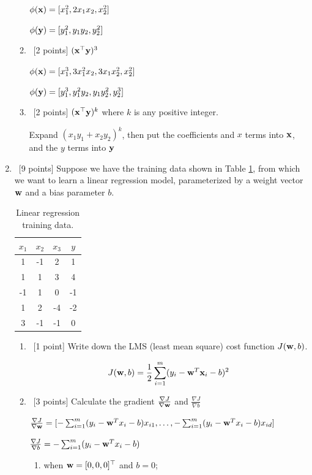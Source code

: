 \documentclass[12pt, fullpage,letterpaper]{article}
\begin{document}
\begin{enumerate}
\begin{enumerate}
		$\phi({\bf x}) = [x_1^2, 2x_1x_2, x_2^2]$
		
		$\phi({\bf y}) = [y_1^2, y_1y_2, y_2^2]$
		\item~[2 points] $({\bf x}^\top {\bf y})^3$
		
		$\phi({\bf x}) = [x_1^3, 3x_1^2x_2, 3x_1x_2^2, x_2^2]$
		
		$\phi({\bf y}) = [y_1^3, y_1^2y_2, y_1y_2^2, y_2^3]$
		\item~[2 points] $({\bf x}^\top {\bf y})^k$ where $k$ is  any positive integer.
		
		Expand $(x_1y_1 + x_2y_2)^k$, then put the coefficients and $x$ terms into ${\bf x}$, and the $y$ terms into ${\bf y}$
	\end{enumerate}

\item~[9 points] Suppose we have the training data shown in Table \ref{tb:1}, from which we want to learn a linear regression model, parameterized by a weight vector ${\bf w}$ and a bias parameter $b$.  
\begin{table}[h]
	\centering
	\begin{tabular}{ccc|c}
		$x_1 $ & $x_2$ & $x_3$ &  $y$\\ 
		\hline\hline
		1 & -1 & 2 & 1 \\ \hline
		1 & 1 & 3 & 4 \\ \hline
		-1 & 1 & 0 & -1 \\ \hline
		1 & 2 & -4 & -2 \\ \hline
		3 & -1 & -1 & 0\\ \hline
	\end{tabular}
	\caption{Linear regression training data.}
	\label{tb:1}
\end{table}

\begin{enumerate}
	\item~[1 point] Write down the LMS (least mean square) cost function $J({\bf w}, b)$. 
	
	$$J({\bf w}, b) = \frac{1}{2} \sum_{i=1}^{m}(y_i - {\bf w}^T{\bf x}_i - b)^2$$
	\bigskip
	\item~[3 points] Calculate the gradient $\frac{\nabla J}{\nabla {\bf w}}$ and $\frac{\nabla J}{\nabla b}$
	
	$\frac{\nabla J}{\nabla {\bf w}} = [-\sum_{i=1}^{m}(y_i - {\bf w}^Tx_i - b)x_{i1}, \ldots, -\sum_{i=1}^{m}(y_i - {\bf w}^Tx_i - b)x_{id}]$
	
	$\frac{\nabla J}{\nabla b} = -\sum_{i=1}^{m}(y_i - {\bf w}^Tx_i - b)$	
	
	\begin{enumerate}
		\item when ${\bf w} = [0,0,0]^\top$ and $b = 0$;
		

\end{enumerate}
\end{enumerate}
\end{enumerate}
\end{document}
